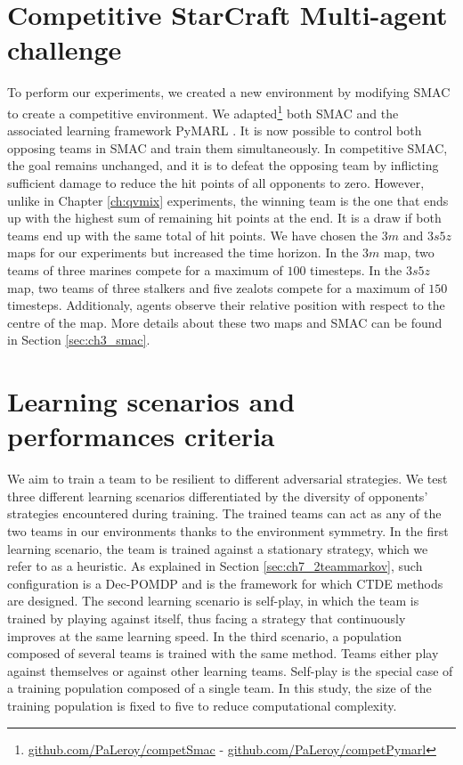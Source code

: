 \section{Competitive StarCraft Multi-agent challenge} \label{sec:ch7_competsmac}

To perform our experiments, we created a new environment by modifying SMAC to create a competitive environment. 
We adapted\footnote{\label{foot_note_code}\url{github.com/PaLeroy/competSmac} - \url{github.com/PaLeroy/competPymarl}} both SMAC and the associated learning framework PyMARL \citep{samvelyan2019starcraft}.
It is now possible to control both opposing teams in SMAC and train them simultaneously.
In competitive SMAC, the goal remains unchanged, and it is to defeat the opposing team by inflicting sufficient damage to reduce the hit points of all opponents to zero.
However, unlike in Chapter \ref{ch:qvmix} experiments, the winning team is the one that ends up with the highest sum of remaining hit points at the end.
It is a draw if both teams end up with the same total of hit points.
We have chosen the $3m$ and $3s5z$ maps for our experiments but increased the time horizon.
In the $3m$ map, two teams of three marines compete for a maximum of $100$ timesteps.
In the $3s5z$ map, two teams of three stalkers and five zealots compete for a maximum of $150$ timesteps.
Additionaly, agents observe their relative position with respect to the centre of the map.
More details about these two maps and SMAC can be found in Section \ref{sec:ch3_smac}.

\section{Learning scenarios and performances criteria} \label{sec:ch7_learningscenar}
We aim to train a team to be resilient to different adversarial strategies.
We test three different learning scenarios differentiated by the diversity of opponents' strategies encountered during training.
The trained teams can act as any of the two teams in our environments thanks to the environment symmetry.
In the first learning scenario, the team is trained against a stationary strategy, which we refer to as a heuristic.
As explained in Section \ref{sec:ch7_2teammarkov}, such configuration is a Dec-POMDP and is the framework for which CTDE methods are designed.
The second learning scenario is self-play, in which the team is trained by playing against itself, thus facing a strategy that continuously improves at the same learning speed.
In the third scenario, a population composed of several teams is trained with the same method.
Teams either play against themselves or against other learning teams.
Self-play is the special case of a training population composed of a single team.
In this study, the size of the training population is fixed to five to reduce computational complexity.

